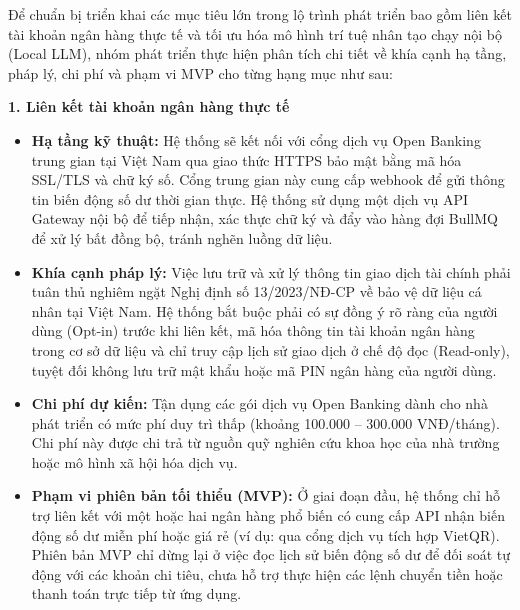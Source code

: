 Để chuẩn bị triển khai các mục tiêu lớn trong lộ trình phát triển bao gồm liên kết tài khoản ngân hàng thực tế và tối ưu hóa mô hình trí tuệ nhân tạo chạy nội bộ (Local LLM), nhóm phát triển thực hiện phân tích chi tiết về khía cạnh hạ tầng, pháp lý, chi phí và phạm vi MVP cho từng hạng mục như sau:

\textbf{1. Liên kết tài khoản ngân hàng thực tế}
\begin{itemize}
    \item \textbf{Hạ tầng kỹ thuật:} Hệ thống sẽ kết nối với cổng dịch vụ Open Banking trung gian tại Việt Nam qua giao thức HTTPS bảo mật bằng mã hóa SSL/TLS và chữ ký số. Cổng trung gian này cung cấp webhook để gửi thông tin biến động số dư thời gian thực. Hệ thống sử dụng một dịch vụ API Gateway nội bộ để tiếp nhận, xác thực chữ ký và đẩy vào hàng đợi BullMQ để xử lý bất đồng bộ, tránh nghẽn luồng dữ liệu.
    \item \textbf{Khía cạnh pháp lý:} Việc lưu trữ và xử lý thông tin giao dịch tài chính phải tuân thủ nghiêm ngặt Nghị định số 13/2023/NĐ-CP về bảo vệ dữ liệu cá nhân tại Việt Nam. Hệ thống bắt buộc phải có sự đồng ý rõ ràng của người dùng (Opt-in) trước khi liên kết, mã hóa thông tin tài khoản ngân hàng trong cơ sở dữ liệu và chỉ truy cập lịch sử giao dịch ở chế độ đọc (Read-only), tuyệt đối không lưu trữ mật khẩu hoặc mã PIN ngân hàng của người dùng.
    \item \textbf{Chi phí dự kiến:} Tận dụng các gói dịch vụ Open Banking dành cho nhà phát triển có mức phí duy trì thấp (khoảng 100.000 -- 300.000 VNĐ/tháng). Chi phí này được chi trả từ nguồn quỹ nghiên cứu khoa học của nhà trường hoặc mô hình xã hội hóa dịch vụ.
    \item \textbf{Phạm vi phiên bản tối thiểu (MVP):} Ở giai đoạn đầu, hệ thống chỉ hỗ trợ liên kết với một hoặc hai ngân hàng phổ biến có cung cấp API nhận biến động số dư miễn phí hoặc giá rẻ (ví dụ: qua cổng dịch vụ tích hợp VietQR). Phiên bản MVP chỉ dừng lại ở việc đọc lịch sử biến động số dư để đối soát tự động với các khoản chi tiêu, chưa hỗ trợ thực hiện các lệnh chuyển tiền hoặc thanh toán trực tiếp từ ứng dụng.
\end{itemize}

